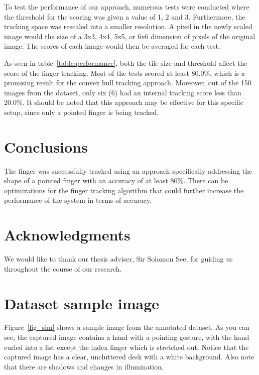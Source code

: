 \documentclass{acm_proc_article-sp}
\begin{document}
To test the performance of our approach, numerous tests were conducted where the threshold for the scoring was given a value of 1, 2 and 3. Furthermore, the tracking space was rescaled into a smaller resolution. A pixel in the newly scaled image would the size of a 3x3, 4x4, 5x5, or 6x6 dimension of pixels of the original image. The scores of each image would then be averaged for each test.

As seen in table~\ref{table:performance}, both the tile size and threshold affect the score of the finger tracking. Most of the tests scored at least 80.0\%, which is a promising result for the convex hull tracking approach. Moreover, out of the 150 images from the dataset, only six (6) had an internal tracking score less than 20.0\%. It should be noted that this approach may be effective for this specific setup, since only a pointed finger is being tracked.

\section{Conclusions}

The finger was successfully tracked using an approach specifically addressing the shape of a pointed finger with an accuracy of at least 80\%. There can be optimizations for the finger tracking algorithm that could further increase the performance of the system in terms of accuracy.


\section{Acknowledgments}

We would like to thank our thesis adviser, Sir Solomon See, for guiding us throughout the course of our research.


%

%
%
\appendix
\section{Dataset sample image}
\label{sample_dataset}
Figure~\ref{fig_sim} shows a sample image from the annotated dataset. As you can see, the captured image contains a hand with a pointing gesture, with the hand curled into a fist except the index finger which is stretched out. Notice that the captured image has a clear, uncluttered desk with a white background. Also note that there are shadows and changes in illumination.


\end{document}
